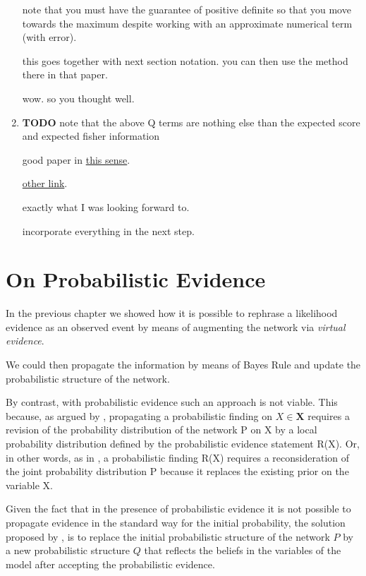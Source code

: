 \documentclass[11pt]{article}
\begin{document}
\begin{article}
\begin{enumerate}
note that you must have the guarantee of positive definite so that
you move towards the maximum despite working with an approximate
numerical term (with error).

this goes together with next section notation. you can then use the
method there in that paper.

wow. so you thought well.


\item {\bfseries\sffamily TODO} note that the above Q terms are nothing else than the expected score and expected fisher information
\label{sec:orgc20e792}

good paper in \href{https://arxiv.org/pdf/1608.01734.pdf}{this sense}.

\href{https://scholar.google.com/scholar?q=Method\%20for\%20Computation\%20of\%20the\%20Fisher\%20Information\%20Matrix\%20in\%20the\%20Expectation\%2DMaximization\%20Algorithm\&btnG=Search\&as\_sdt=800000000001\&as\_sdtp=on}{other link}.

exactly what I was looking forward to.

incorporate everything in the next step.
\end{enumerate}


\section{On Probabilistic Evidence}
\label{sec:orgeddda00}

In the previous chapter we showed how it is possible to rephrase a
likelihood evidence as an observed event by means of augmenting the
network via \emph{virtual evidence}.

We could then propagate the information by means of Bayes Rule
and update the probabilistic structure of the network.

By contrast, with probabilistic evidence such an approach is not
viable. This because, as argued by \cite{PENG_2010}, propagating a
probabilistic finding on \(X \in \textbf{X}\) requires a revision of
the probability distribution of the network P on X by a local
probability distribution defined by the probabilistic evidence
statement R(X). Or, in other words, as in \cite{Mrad_2015}, a
probabilistic finding R(X) requires a reconsideration of the joint
probability distribution P because it replaces the existing prior on
the variable X.

Given the fact that in the presence of probabilistic evidence it is
not possible to propagate evidence in the standard way for the
initial probability, the solution proposed by \cite{jeffrey1990logic},
is to replace the initial probabilistic structure of the network \(P\)
by a new probabilistic structure \(Q\) that reflects the beliefs in
the variables of the model after accepting the probabilistic
evidence.


\end{article}
\end{document}
